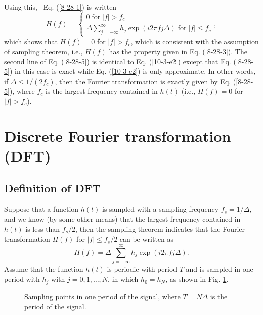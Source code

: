 \documentclass{article}
\newcommand{\tmop}[1]{\ensuremath{\operatorname{#1}}}
\begin{document}
Using this, \ Eq. (\ref{8-28-1}) is written
\begin{equation}
  \label{8-28-5} H (f) = \left\{ \begin{array}{l}
    0 \tmop{for} |f| > f_c\\
    \Delta \sum_{j = - \infty}^{\infty} h_j \exp (i 2 \pi f j \Delta)
    \tmop{for} |f| \leqslant f_c
  \end{array}, \right.
\end{equation}
which shows that $H (f) = 0$ for $|f| > f_c$, which is consistent with the
assumption of sampling theorem, i.e., $H (f)$ has the property given in Eq.
(\ref{8-28-3}). The second line of Eq. (\ref{8-28-5}) is identical to Eq.
(\ref{10-3-e2}) except that Eq. (\ref{8-28-5}) in this case is exact while Eq.
(\ref{10-3-e2}) is only approximate. In other words, if $\Delta \leqslant 1 /
(2 f_c)$, then the Fourier transformation is exactly given by Eq.
(\ref{8-28-5}), where $f_c$ is the largest frequency contained in $h (t)$
(i.e., $H (f) = 0$ for $|f| > f_c$).

\section{Discrete Fourier transformation (DFT)}\label{9-29-8}

\subsection{Definition of DFT}

Suppose that a function $h (t)$ is sampled with a sampling frequency $f_s = 1
/ \Delta$, and we know (by some other means) that the largest frequency
contained in $h (t)$ is less than $f_s / 2$, then the sampling theorem
indicates that the Fourier transformation $H (f)$ for $|f| \leqslant f_s / 2$
can be written as
\begin{equation}
  \label{2-26-p1} H (f) = \Delta \sum_{j = - \infty}^{\infty} h_j \exp (i 2
  \pi f j \Delta) .
\end{equation}
Assume that the function $h (t)$ is periodic with period $T$ and is sampled in
one period with $h_j$ with $j = 0, 1, \ldots, N$, in which $h_0 = h_N$, as
shown in Fig. \ref{16-2-25}.

\begin{figure}[h]
  \caption{\label{16-2-25}Sampling points in one period of the signal, where
  $T = N \Delta$ is the period of the signal.}
\end{figure}
\end{document}
